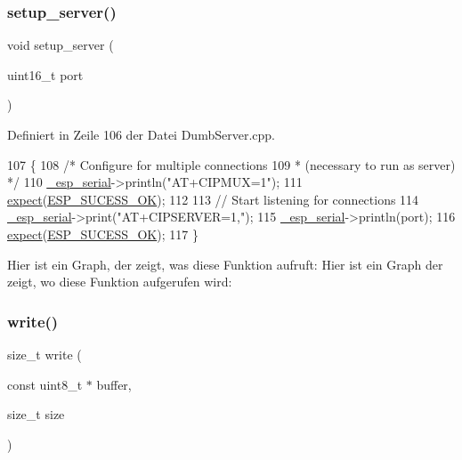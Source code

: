 \subsubsection{\texorpdfstring{setup\+\_\+server()}{setup\_server()}}
{\footnotesize\ttfamily void setup\+\_\+server (\begin{DoxyParamCaption}\item[{uint16\+\_\+t}]{port }\end{DoxyParamCaption})\hspace{0.3cm}{\ttfamily [private]}}



Definiert in Zeile 106 der Datei Dumb\+Server.\+cpp.


\begin{DoxyCode}
107 \{
108   \textcolor{comment}{/* Configure for multiple connections}
109 \textcolor{comment}{   * (necessary to run as server) */}
110   \hyperlink{classEspServer_a552aab874ad99b696f4c997d6f5a4746}{\_esp\_serial}->println(\textcolor{stringliteral}{"AT+CIPMUX=1"});
111   \hyperlink{classEspServer_aff5ea67ab96af075223b2b836036ccf1}{expect}(\hyperlink{DumbServer_8cpp_a62497fcb12b1cedd5fdfbc0755508d87}{ESP\_SUCESS\_OK});
112 
113   \textcolor{comment}{// Start listening for connections}
114   \hyperlink{classEspServer_a552aab874ad99b696f4c997d6f5a4746}{\_esp\_serial}->print(\textcolor{stringliteral}{"AT+CIPSERVER=1,"});
115   \hyperlink{classEspServer_a552aab874ad99b696f4c997d6f5a4746}{\_esp\_serial}->println(port);
116   \hyperlink{classEspServer_aff5ea67ab96af075223b2b836036ccf1}{expect}(\hyperlink{DumbServer_8cpp_a62497fcb12b1cedd5fdfbc0755508d87}{ESP\_SUCESS\_OK});
117 \}
\end{DoxyCode}
Hier ist ein Graph, der zeigt, was diese Funktion aufruft\+:
Hier ist ein Graph der zeigt, wo diese Funktion aufgerufen wird\+:
\mbox{\label{classEspServer_a7c66fc8d559f4956d4ccea196299bca7}} 
\subsubsection{\texorpdfstring{write()}{write()}\hspace{0.1cm}{\footnotesize\ttfamily [1/6]}}
{\footnotesize\ttfamily size\+\_\+t write (\begin{DoxyParamCaption}\item[{const uint8\+\_\+t $\ast$}]{buffer,  }\item[{size\+\_\+t}]{size }\end{DoxyParamCaption})\hspace{0.3cm}{\ttfamily [virtual]}}



